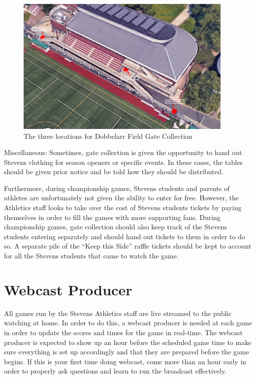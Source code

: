\documentclass{article}
\begin{document}
\begin{figure}[h]
\begin{center}
\includegraphics[width=400px]{images/GateCollections.png}
\caption{The three locations for Dobbelarr Field Gate Collection}
\end{center}
\end{figure}

Miscellaneous:
Sometimes, gate collection is given the opportunity to hand out Stevens clothing for season openers or specific events. In these cases, the tables should be given prior notice and be told how they should be distributed. 
\newline

Furthermore, during championship games, Stevens students and parents of athletes are unfortunately not given the ability to enter for free. However, the Athletics staff looks to take over the cost of Stevens students tickets by paying themselves in order to fill the games with more supporting fans. During championship games, gate collection should also keep track of the Stevens students entering separately and should hand out tickets to them in order to do so. A separate pile of the “Keep this Side” raffle tickets should be kept to account for all the Stevens students that came to watch the game.  

\section{Webcast Producer}
All games run by the Stevens Athletics staff are live streamed to the public watching at home. In order to do this, a webcast producer is needed at each game in order to update the scores and times for the game in real-time. The webcast producer is expected to show up an hour before the scheduled game time to make sure everything is set up accordingly and that they are prepared before the game begins. If this is your first time doing webcast, come more than an hour early in order to properly ask questions and learn to run the broadcast effectively. 
\end{document}
